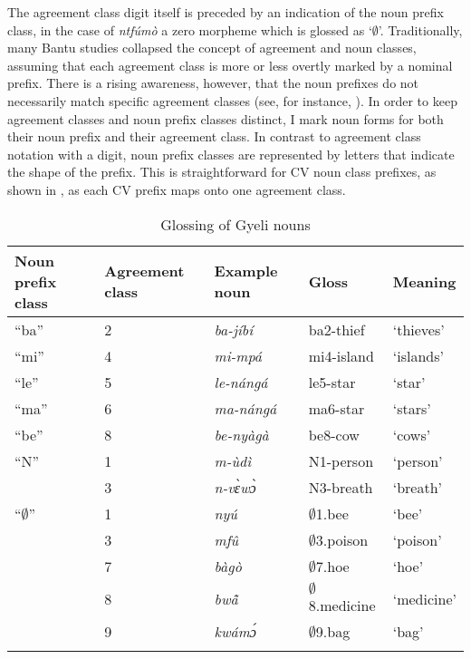 The agreement class digit itself is preceded by an indication of the noun prefix class, in the case of {\itshape ntfúmò} a zero morpheme which is glossed as `$\emptyset$'. Traditionally, many Bantu studies collapsed the concept of agreement and noun classes, assuming that each agreement class is more or less overtly marked by a nominal prefix. There is a rising awareness, however, that the noun prefixes do not necessarily match specific agreement classes (see, for instance, \citealt{guldemann2019}). In order to keep agreement classes and noun prefix classes distinct, I mark noun forms for both their noun prefix and their agreement class. In contrast to agreement class notation with a digit, noun prefix classes are represented by letters that indicate the shape of the prefix. This is straightforward for CV noun class prefixes, as shown in , as each CV prefix maps onto one agreement class.

\begin{table}
\begin{tabularx}{\textwidth}{XXXXl}
\lsptoprule
Noun prefix class & Agreement class &  Example noun & Gloss & Meaning \\
\midrule
``ba'' & 2 &  {\itshape ba-jíbí} & ba2-thief  & `thieves'   \\ 
``mi'' & 4 &  {\itshape mi-mpá} & mi4-island  & `islands'  \\ 
``le'' & 5 &  {\itshape le-nángá} & le5-star & `star' \\ 
``ma'' & 6 &   {\itshape ma-nángá} & ma6-star & `stars'  \\
``be'' & 8 &  {\itshape be-nyàgà} & be8-cow & `cows' \\  
\midrule
``N'' & 1 &  {\itshape m-ùdì} & {N1}-person  & `person'  \\
      &  3 &  {\itshape n-vɛ̀wɔ̀} & {N3}-breath & `breath' \\
``$\emptyset$'' & 1 &  {\itshape nyú} & $\emptyset$1.bee & `bee' \\
              & 3 &  {\itshape mfû} & $\emptyset$3.poison & `poison' \\
            & 7 &  {\itshape bàgò} & $\emptyset$7.hoe & `hoe' \\
                & 8 &  {\itshape bwã̂} & $\emptyset$8.medicine & `medicine' \\
            & 9 &  {\itshape kwámɔ́} & $\emptyset$9.bag & `bag' \\

\lspbottomrule
\end{tabularx}
\caption{Glossing of Gyeli nouns}
\label{Tab:Ngloss}
\end{table}

